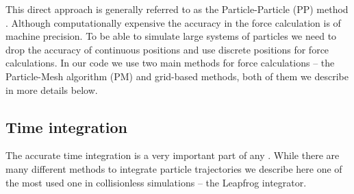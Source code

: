 This direct approach is generally referred to as the Particle-Particle (PP) method \parencite{Hockney:1988:CSU:62815}. Although computationally expensive the accuracy in the force calculation is of machine precision. To be able to simulate large systems of particles we need to drop the accuracy of continuous positions and use discrete positions for force calculations. In our code we use two main methods for force calculations -- the Particle-Mesh algorithm (PM) and grid-based methods, both of them we describe in more details below.
\subsection{Time integration}
The accurate time integration is a very important part of any \nbodysim. While there are many different methods to integrate particle trajectories \parencite[see e.g.][]{Hockney:1988:CSU:62815} we describe here one of the most used one in collisionless simulations -- the Leapfrog integrator.

